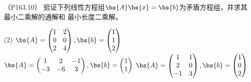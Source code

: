 \documentclass[12pt, a4paper, oneside, UTF8]{ctexbook}
\begin{document}
\begin{question}（P163.10）
    验证下列线性方程组$\bs{A}\bs{x}=\bs{b}$为矛盾方程组，并求其最小二乘解的通解和
    最小长度二乘解。
    \begin{tasks}[label=(\arabic*)](2)
        \task $\bs{A}=\begin{pmatrix}
            1&2\\
            0&0\\
            2&4
        \end{pmatrix},\bs{b}=\begin{pmatrix}
            1\\
            1\\
            2
        \end{pmatrix}$
        \task $\bs{A}=\begin{pmatrix}
            1&2&-1\\
            -3&-6&3
        \end{pmatrix},\bs{b}=\begin{pmatrix}
            1\\
            1
        \end{pmatrix}$
        \task $\bs{A}=\begin{pmatrix}
            1&1\\
            2&0\\
            -1&3
        \end{pmatrix},\bs{b}=\begin{pmatrix}
            1\\
            0\\
            2
        \end{pmatrix}$
    \end{tasks}
\end{question}
\end{document}
